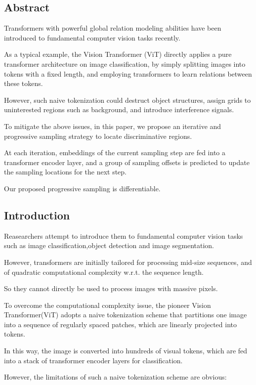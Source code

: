 \documentclass[11pt]{article}
\begin{document}
\subsection{Abstract}
Transformers with powerful global relation modeling abilities have been introduced to fundamental computer vision tasks recently.

As a typical example, the Vision Transformer (ViT) directly applies a pure transformer architecture on image classification, by simply splitting images into tokens with a fixed length, and employing transformers to learn relations between these tokens.

However, such naive tokenization could destruct object structures, assign grids to uninterested regions such as background, and introduce interference signals. 

To mitigate the above issues, in this paper, we propose an iterative and progressive sampling
strategy to locate discriminative regions.

At each iteration, embeddings of the current sampling step are fed into a transformer encoder layer, and a group of sampling offsets is predicted to update the sampling locations for the next step.

Our proposed progressive sampling is differentiable.

\subsection{Introduction}
Reasearchers attempt to introduce them to fundamental computer vision tasks such as image classification,object detection and image segmentation.

However, transformers are initially tailored for processing mid-size sequences, and of quadratic
computational complexity w.r.t. the sequence length.

So they cannot directly be used to process images with massive pixels.

To overcome the computational complexity issue, the pioneer Vision Transformer(ViT) adopts a naive tokenization scheme that partitions one image into a sequence of regularly spaced patches, which are linearly projected into tokens. 

In this way, the image is converted into hundreds of visual tokens, which are fed into a stack of transformer encoder layers for classification. 

However, the limitations of such a naive tokenization scheme are obvious:
\end{document}
